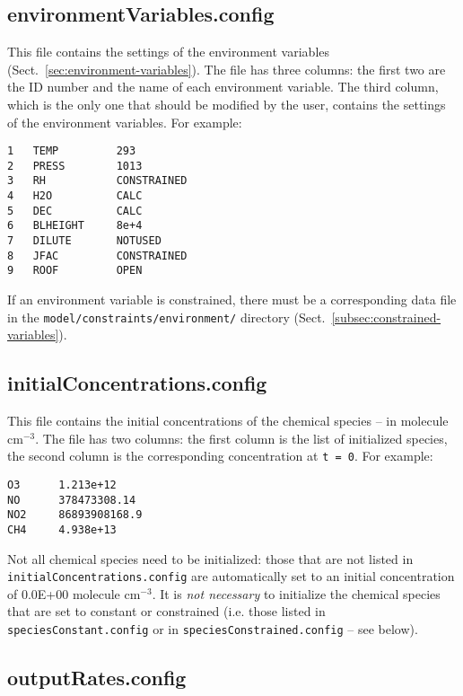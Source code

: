 \subsection{environmentVariables.config} \label{subsec:environmentvariables}

This file contains the settings of the environment variables
(Sect.~\ref{sec:environment-variables}). The file has three columns:
the first two are the ID number and the name of each
environment variable. The third column, which is the only one that
should be modified by the user, contains the settings of the
environment variables. For example:

\begin{verbatim}
1   TEMP         293
2   PRESS        1013
3   RH           CONSTRAINED
4   H2O          CALC
5   DEC          CALC
6   BLHEIGHT     8e+4
7   DILUTE       NOTUSED
8   JFAC         CONSTRAINED
9   ROOF         OPEN
\end{verbatim}

If an environment variable is constrained, there must be a
corresponding data file in the \texttt{model/constraints/environment/}
directory (Sect.~\ref{subsec:constrained-variables}).

\subsection{initialConcentrations.config} \label{subsec:initialconcentrations}

This file contains the initial concentrations of the chemical species
-- in molecule cm$^{-3}$. The file has two columns: the first column
is the list of initialized species, the second column is the
corresponding concentration at \texttt{t\ =\ 0}. For example:

\begin{verbatim}
O3      1.213e+12
NO      378473308.14
NO2     86893908168.9
CH4     4.938e+13
\end{verbatim}

Not all chemical species need to be initialized: those that are not
listed in \texttt{initialConcentrations.config} are automatically set
to an initial concentration of 0.0E+00 molecule cm$^{-3}$. It is
\emph{not necessary} to initialize the chemical species that are set
to constant or constrained (i.e. those listed in
\texttt{speciesConstant.config} or in \texttt{speciesConstrained.config}
-- see below).

\subsection{outputRates.config} \label{subsec:outputrates}

